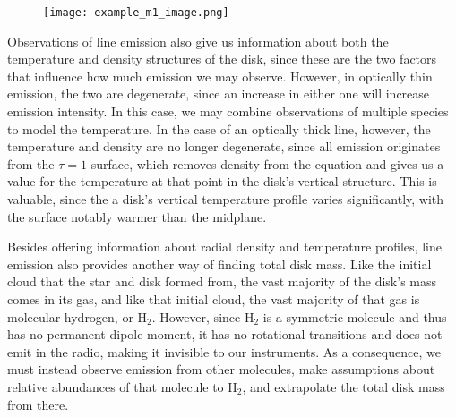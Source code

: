\begin{figure}[t!]
\centering
  \texttt{[image: example\_m1\_image.png]}
  \label{fig:ex_mom1}
\end{figure}


Observations of line emission also give us information about both the temperature and density structures of the disk, since these are the two factors that influence how much emission we may observe. However, in optically thin emission, the two are degenerate, since an increase in either one will increase emission intensity. In this case, we may combine observations of multiple species to model the temperature. In the case of an optically thick line, however, the temperature and density are no longer degenerate, since all emission originates from the $\tau=1$ surface, which removes density from the equation and gives us a value for the temperature at that point in the disk's vertical structure. This is valuable, since the a disk's vertical temperature profile varies significantly, with the surface notably warmer than the midplane.

Besides offering information about radial density and temperature profiles, line emission also provides another way of finding total disk mass. Like the initial cloud that the star and disk formed from, the vast majority of the disk's mass comes in its gas, and like that initial cloud, the vast majority of that gas is molecular hydrogen, or H$_2$. However, since H$_2$ is a symmetric molecule and thus has no permanent dipole moment, it has no rotational transitions and does not emit in the radio, making it invisible to our instruments. As a consequence, we must instead observe emission from other molecules, make assumptions about relative abundances of that molecule to H$_2$, and extrapolate the total disk mass from there.


